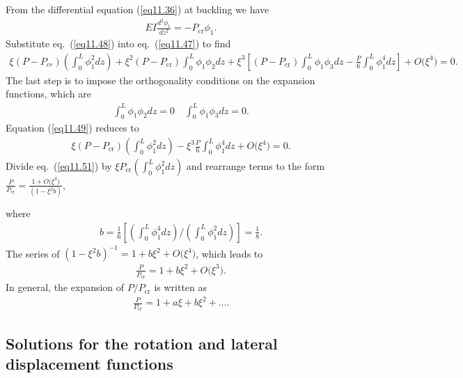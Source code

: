 \documentclass{AeroStructure-ERJohnson}
\begin{document}
From the differential equation (\ref{eq11.36}) at buckling we have
\begin{align}
E I \frac{d^{2} \phi_{1}}{d z^{2}}=-P_{\textrm{cr}} \phi_{1}. \label{eq11.48}
\end{align}
Substitute eq.~(\ref{eq11.48}) into eq.~(\ref{eq11.47}) to find
\begin{align}
\xi\left(P-P_{c r}\right)\left(\int_{0}^{L} \phi_{1}^{2} d z\right)+\xi^{2}\left(P-P_{\textrm{cr}}\right) \int_{0}^{L} \phi_{1} \phi_{2} d z+\xi^{3}\left[\left(P-P_{\textrm{cr}}\right) \int_{0}^{L} \phi_{1} \phi_{3} d z-\frac{P}{6} \int_{0}^{L} \phi_{1}^{4} d z\right]+O\big(\xi^{4}\big)=0. \label{eq11.49}
\end{align}
The last step is to impose the orthogonality conditions on the expansion functions, which are
\begin{align}\label{eq11.50}
\int_{0}^{L} \phi_{1} \phi_{2} d z=0 \quad \int_{0}^{L} \phi_{1} \phi_{3} d z=0.
\end{align}
Equation (\ref{eq11.49}) reduces to
\begin{align}\label{eq11.51}
\xi\left(P-P_{\mathrm{cr}}\right)\left(\int_{0}^{L} \phi_{1}^{2} d z\right)-\xi^{3} \frac{P}{6} \int_{0}^{L} \phi_{1}^{4} d z+O\big(\xi^{4}\big)=0.
\end{align}
Divide eq.~(\ref{eq11.51}) by $\xi P_{\mathrm{cr}}\left(\int_{0}^{L} \phi_{1}^{2} d z\right)$ and rearrange terms to the form $\frac{P}{P_{\mathrm{cr}}}=\frac{1+O\big(\xi^{3}\big)}{\left(1-\xi^{2} b\right)}$,

\noindent where
\begin{align}\label{eq11.52}
b=\frac{1}{6}\left[\left(\int_{0}^{L} \phi_{1}^{4} d z\right) /\left(\int_{0}^{L} \phi_{1}^{2} d z\right)\right]=\frac{1}{8}.
\end{align}
The series of $\left(1-\xi^{2} b\right)^{-1}=1+b \xi^{2}+O\big(\xi^{4}\big)$, which leads to
\begin{align}\label{eq11.53}
\frac{P}{P_{\mathrm{cr}}}=1+b \xi^{2}+O\big(\xi^{3}\big).
\end{align}
In general, the expansion of $P/P_{\mathrm{cr}}$ is written as
\begin{align}\label{eq11.54}
\frac{P}{P_{\mathrm{cr}}}=1+a \xi+b \xi^{2}+\ldots.
\end{align}

\subsection{Solutions for the rotation and lateral displacement functions}\label{sec11.2.5}
\end{document}
